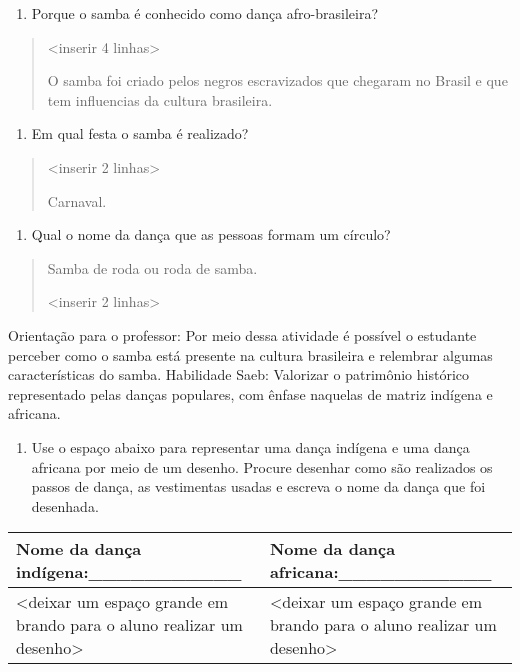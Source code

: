 \begin{enumerate}
\def\labelenumi{\alph{enumi})}
\item
  Porque o samba é conhecido como dança afro-brasileira?
\end{enumerate}

\begin{quote}
\textless{}inserir 4 linhas\textgreater{}

O samba foi criado pelos negros escravizados que chegaram no Brasil e
que tem influencias da cultura brasileira.
\end{quote}

\begin{enumerate}
\def\labelenumi{\alph{enumi})}
\item
  Em qual festa o samba é realizado?
\end{enumerate}

\begin{quote}
\textless{}inserir 2 linhas\textgreater{}

Carnaval.
\end{quote}

\begin{enumerate}
\def\labelenumi{\alph{enumi})}
\item
  Qual o nome da dança que as pessoas formam um círculo?
\end{enumerate}

\begin{quote}
Samba de roda ou roda de samba.

\textless{}inserir 2 linhas\textgreater{}
\end{quote}

Orientação para o professor: Por meio dessa atividade é possível o
estudante perceber como o samba está presente na cultura brasileira e
relembrar algumas características do samba. Habilidade Saeb: Valorizar o
patrimônio histórico representado pelas danças populares, com ênfase
naquelas de matriz indígena e africana.

\begin{enumerate}
\def\labelenumi{\arabic{enumi}.}
\item
  Use o espaço abaixo para representar uma dança indígena e uma dança
  africana por meio de um desenho. Procure desenhar como são realizados
  os passos de dança, as vestimentas usadas e escreva o nome da dança
  que foi desenhada.
\end{enumerate}

\begin{longtable}[]{@{}ll@{}}
\toprule
Nome da dança indígena:\_\_\_\_\_\_\_\_\_\_\_ & Nome da dança
africana:\_\_\_\_\_\_\_\_\_\_\_\tabularnewline
\midrule
\endhead
\textless{}deixar um espaço grande em brando para o aluno realizar um
desenho\textgreater{} & \textless{}deixar um espaço grande em brando
para o aluno realizar um desenho\textgreater{}\tabularnewline
\bottomrule
\end{longtable}

